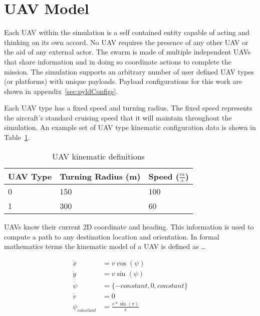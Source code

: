 \section{UAV Model}
\label{sec:uav_model}
Each UAV within the simulation is a self contained entity capable of acting and thinking on its own accord.  No UAV requires the presence of any other UAV or the aid of any external actor.  The swarm is made of multiple independent UAVs that share information and in doing so coordinate actions to complete the mission.  The simulation supports an arbitrary number of user defined UAV types (or platforms) with unique payloads.  Payload configurations for this work are shown in appendix~\ref{sec:pyldConfigs}.


Each UAV type has a fixed speed and turning radius.  The fixed speed represents the aircraft's standard cruising speed that it will maintain throughout the simulation.  An example set of UAV type kinematic configuration data is shown in Table~\ref{tab:uavKinematic}.

\begin{table}[H]
	\caption{UAV kinematic definitions}
	\centering
	\label{tab:uavKinematic}
	\begin{tabular}{|p{1cm}|p{2cm}|p{1cm}|}
		\hline
		UAV Type & Turning Radius (m) & Speed ($\frac{m}{s}$)\\ \hline
		0 & 150 & 100 \\ \hline
		1 & 300 & 60 \\ \hline
	\end{tabular}
\end{table}

UAVs know their current 2D coordinate and heading.  This information is used to compute a path to any destination location and orientation.  In formal mathematics terms the kinematic model of a UAV is defined as \dots

\begin{align}
\dot{x} &= v \cos(\psi) \label{eq:uavChngX}\\
\dot{y} &= v \sin(\psi) \label{eq:uavChngY}\\
\dot{\psi} &= \{-constant, 0, constant\} \label{eq:uavTurnRate}\\
\dot{v} &= 0 \label{eq:uavAccel}\\
\psi_{constant} &= \frac{v*\sin(\pi)}{r} \label{eq:uavTurnRateDeriv}
\end{align}

